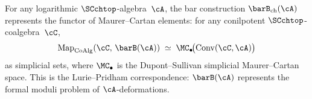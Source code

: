 \begin{theorem}
\label{thm:bar-representability}
For any logarithmic $\SCchtop$-algebra~$\cA$, the bar
construction $\barB_{\mathrm{ch}}(\cA)$ represents the functor
of Maurer--Cartan elements: for any conilpotent
$\SCchtop$-coalgebra~$\cC$,
\begin{equation}\label{eq:bar-representability}
\mathrm{Map}_{\mathrm{CoAlg}}(\cC,\, \barB(\cA))
\;\simeq\;
\MC_\bullet\!\bigl(\mathrm{Conv}(\cC, \cA)\bigr)
\end{equation}
as simplicial sets, where $\MC_\bullet$ is the Dupont--Sullivan
simplicial Maurer--Cartan space. This is the Lurie--Pridham
correspondence: $\barB(\cA)$ represents the formal moduli problem
of $\cA$-deformations.
\end{theorem}

